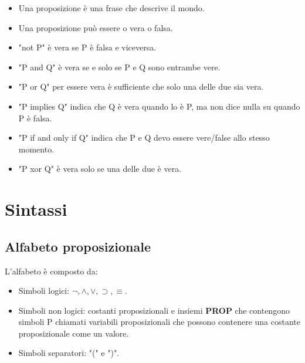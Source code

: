 \documentclass[../main.tex]{subfiles}
\begin{document}
    \begin{itemize}
        \item Una proposizione è una frase che descrive il mondo.
        \item Una proposizione può essere o vera o falsa.
        \item "not P" è vera se P è falsa e viceversa.
        \item "P and Q" è vera se e solo se P e Q sono entrambe vere.
        \item "P or Q" per essere vera è sufficiente che solo una delle due sia vera.
        \item "P implies Q" indica che Q è vera quando lo è P, ma non dice nulla su quando P è falsa.
        \item "P if and only if Q" indica che P e Q devo essere vere/false allo stesso momento.
        \item "P xor Q" è vera solo se una delle due è vera.
    \end{itemize}

    \section{Sintassi}
    \subsection{Alfabeto proposizionale}
    L'alfabeto è composto da:
    \begin{itemize}
        \item Simboli logici: $\lnot, \land, \lor,\supset , \equiv$.
        \item Simboli non logici: costanti proposizionali e insiemi \textbf{PROP} che contengono simboli P chiamati variabili proposizionali che possono contenere una costante proposizionale come un valore.
        \item Simboli separatori: "(" e ")".
    \end{itemize}
\end{document}
